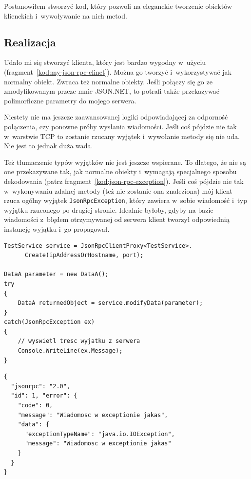 Postanowiłem stworzyć kod, który pozwoli na eleganckie tworzenie obiektów klienckich i~wywoływanie na nich metod.

\subsection{Realizacja}
Udało mi się stworzyć klienta, który jest bardzo wygodny w~użyciu (fragment~\ref{kod:my-json-rpc-clinet}).
Można go tworzyć i~wykorzystywać jak normalny obiekt. Zwraca też normalne obiekty.
Jeśli połączy się go ze zmodyfikowanym przeze mnie JSON.NET, to potrafi także przekazywać polimorficzne parametry do mojego serwera.

Niestety nie ma jeszcze zaawansowanej logiki odpowiadającej za odporność połączenia, czy ponowne próby wysłania wiadomości. Jeśli coś pójdzie nie tak w~warstwie TCP to zostanie rzucany wyjątek i~wywołanie metody się nie uda.
Nie jest to jednak duża wada.

Też tłumaczenie typów wyjątków nie jest jeszcze wspierane.
To dlatego, że nie są one przekazywane tak, jak normalne obiekty i~wymagają specjalnego sposobu dekodowania (patrz fragment~\ref{kod:json-rpc-exception}).
Jeśli coś pójdzie nie tak w~wykonywaniu zdalnej metody (też nie zostanie ona znaleziona) mój klient rzuca ogólny wyjątek \texttt{JsonRpcException}, który zawiera w~sobie wiadomość i~typ wyjątku rzuconego po drugiej stronie.
Idealnie byłoby, gdyby na bazie wiadomości z~błędem otrzymywanej od serwera klient tworzył odpowiednią instancję wyjątku i~go propagował.

\begin{lstlisting}[float, frame=single, caption={Tworzenie obiektu proxy do obiektu zdalnego przy użyciu mojej implementacji klienta JSON-RPC pod .NET.}, label=kod:my-json-rpc-clinet]
TestService service = JsonRpcClientProxy<TestService>.
      Create(ipAddressOrHostname, port);

DataA parameter = new DataA();
try
{
    DataA returnedObject = service.modifyData(parameter);
}
catch(JsonRpcException ex)
{
    // wyswietl tresc wyjatku z serwera
    Console.WriteLine(ex.Message);
}
\end{lstlisting}

\begin{lstlisting}[float, frame=single, caption={Wiadomość od serwera JSON-RPC zawierająca wyjątek.}, label=kod:json-rpc-exception]
{
  "jsonrpc": "2.0",
  "id": 1, "error": {
    "code": 0,
    "message": "Wiadomosc w exceptionie jakas",
    "data": {
      "exceptionTypeName": "java.io.IOException",
      "message": "Wiadomosc w exceptionie jakas"
    }
  }
}
\end{lstlisting}




